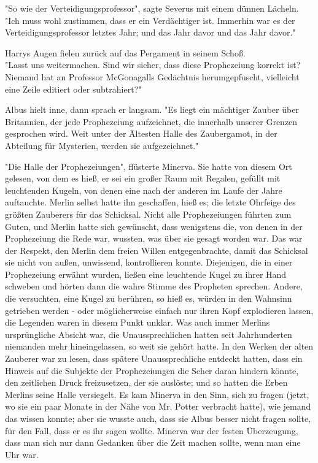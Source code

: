 {"So wie der Verteidigungsprofessor", sagte Severus mit einem dünnen Lächeln. "Ich muss wohl zustimmen, dass er ein Verdächtiger ist. Immerhin war es der Verteidigungsprofessor letztes Jahr; und das Jahr davor und das Jahr davor."

Harrys Augen fielen zurück auf das Pergament in seinem Schoß.\\ "Lasst uns weitermachen. Sind wir sicher, dass diese Prophezeiung korrekt ist? Niemand hat an Professor McGonagalls Gedächtnis herumgepfuscht, vielleicht eine Zeile editiert oder subtrahiert?"

Albus hielt inne, dann sprach er langsam. "Es liegt ein mächtiger Zauber über Britannien, der jede Prophezeiung aufzeichnet, die innerhalb unserer Grenzen gesprochen wird. Weit unter der Ältesten Halle des Zaubergamot, in der Abteilung für Mysterien, werden sie aufgezeichnet."

"Die Halle der Prophezeiungen", flüsterte Minerva. Sie hatte von diesem Ort gelesen, von dem es hieß, er sei ein großer Raum mit Regalen, gefüllt mit leuchtenden Kugeln, von denen eine nach der anderen im Laufe der Jahre auftauchte. Merlin selbst hatte ihn geschaffen, hieß es; die letzte Ohrfeige des größten Zauberers für das Schicksal. Nicht alle Prophezeiungen führten zum Guten, und Merlin hatte sich gewünscht, dass wenigstens die, von denen in der Prophezeiung die Rede war, wussten, was über sie gesagt worden war. Das war der Respekt, den Merlin dem freien Willen entgegenbrachte, damit das Schicksal sie nicht von außen, unwissend, kontrollieren konnte. Diejenigen, die in einer Prophezeiung erwähnt wurden, ließen eine leuchtende Kugel zu ihrer Hand schweben und hörten dann die wahre Stimme des Propheten sprechen. Andere, die versuchten, eine Kugel zu berühren, so hieß es, würden in den Wahnsinn getrieben werden - oder möglicherweise einfach nur ihren Kopf explodieren lassen, die Legenden waren in diesem Punkt unklar. Was auch immer Merlins ursprüngliche Absicht war, die Unaussprechlichen hatten seit Jahrhunderten niemanden mehr hineingelassen, so weit sie gehört hatte. In den Werken der alten Zauberer war zu lesen, dass spätere Unaussprechliche entdeckt hatten, dass ein Hinweis auf die Subjekte der Prophezeiungen die Seher daran hindern könnte, den zeitlichen Druck freizusetzen, der sie auslöste; und so hatten die Erben Merlins seine Halle versiegelt. Es kam Minerva in den Sinn, sich zu fragen (jetzt, wo sie ein paar Monate in der Nähe von Mr. Potter verbracht hatte), wie jemand das wissen konnte; aber sie wusste auch, dass sie Albus besser nicht fragen sollte, für den Fall, dass er es ihr sagen wollte. Minerva war der festen Überzeugung, dass man sich nur dann Gedanken über die Zeit machen sollte, wenn man eine Uhr war.

}
